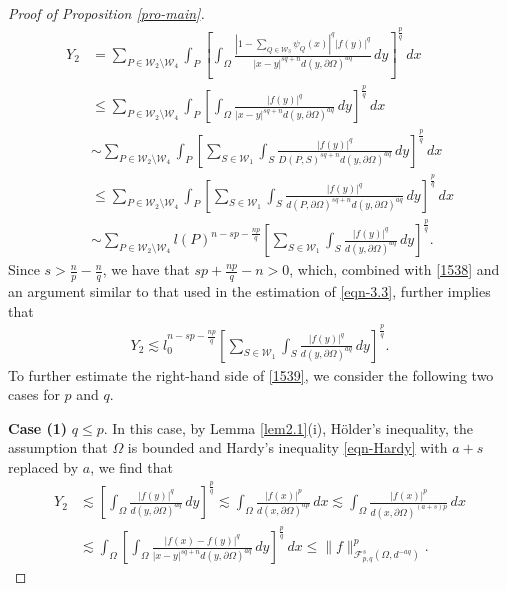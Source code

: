 \documentclass[11pt,twoside]{article}
\def\cf{{\mathcal F}}
\def\cw{\mathcal W}
\def\boz{{\Omega}}
\def\pa{\partial}                %
\newcounter{assum}
\theoremstyle{mylem}
\theoremstyle{definition}
\numberwithin{equation}{section}
\begin{document}
\begin{proof}[Proof of Proposition \ref{pro-main}]
\begin{align}
Y_2
&= \sum_{P\in\cw_2\setminus\cw_4} \int_{P}\left[ \int_{\boz} \frac{ |1- \sum_{Q\in\mathcal{W}_3} \psi_Q(x) |^q | f(y) |^q}{|x - y|^{s q + n}d(y,\pa\boz)^{aq}}\,dy \right]^{\frac{p}{q}}\,dx \nonumber \\
&\leq\sum_{P\in\cw_2\setminus\cw_4} \int_{P}\left[ \int_{\boz} \frac{ | f(y) |^q}{|x - y|^{s q + n}d(y,\pa\boz)^{aq}}\,dy \right]^{\frac{p}{q}} \,dx \nonumber\\
&\sim \sum_{P\in\cw_2\setminus\cw_4} \int_{P} \left[ \sum_{S\in\mathcal{W}_1} \int_{S} \frac{ | f(y) |^q}{D(P,S)^{s q + n}d(y,\pa\boz)^{aq}}\,dy \right]^{\frac{p}{q}}\,dx \nonumber\\
&\leq \sum_{P\in\cw_2\setminus\cw_4} \int_{P} \left[ \sum_{S\in\mathcal{W}_1} \int_{S} \frac{ | f(y) |^q}{d(P,\pa\boz)^{s q + n}d(y,\pa\boz)^{aq}}\,dy \right]^{\frac{p}{q}}\,dx \nonumber\\
&\sim\sum_{P\in\cw_2\setminus\cw_4}l(P)^{n-sp-\frac{np}{q}}\left[ \sum_{S\in\mathcal{W}_1} \int_{S} \frac{ | f(y) |^q}{d(y,\pa\boz)^{aq}} \,dy \right]^{\frac{p}{q}}.
\end{align}
Since $s>\frac{n}{p}-\frac{n}{q}$, we have that $s p + \frac{np}{q}-n>0$,
which, combined with \eqref{1538} and an argument similar to that used in the estimation of \eqref{eqn-3.3}, further implies that
\begin{align}\label{1539}
Y_2 \lesssim l_0^{n-sp - \frac{np}{q}}\left[ \sum_{S\in\mathcal{W}_1} \int_{S} \frac{ | f(y) |^q}{d(y,\pa\boz)^{aq}}\,dy \right]^{\frac{p}{q}}. 
\end{align}
To further estimate the right-hand side of \eqref{1539},
we consider the following two cases for $p$ and $q$.

{\bf Case (1)} $q\leq p$. In this case, by Lemma \ref{lem2.1}(i), H\"older's inequality, the assumption that $\boz$ is bounded and Hardy's inequality \eqref{eqn-Hardy} with $a+s$ replaced by $a$, we find that
\begin{align}
Y_2 &\lesssim\left[ \int_{\boz} \frac{ | f(y) |^q}{d(y,\pa\boz)^{aq}} \,dy \right]^{\frac{p}{q}}
\lesssim \int_{\boz}\frac{ | f(x) |^p}{d(x,\pa\boz)^{ap}}\,dx 
\lesssim \int_{\boz}\frac{ | f(x) |^p}{d(x,\pa\boz)^{(a+s)p}}\,dx\nonumber \\
&\lesssim \int_{\boz} \left[ \int_{\boz} \frac{|f(x) - f(y)|^q}{|x - y|^{s q + n}d(y,\pa\boz)^{aq}}\,dy \right]^{\frac{p}{q}}\,dx
\leq \| f \|_{\cf_{p,q}^{s}(\boz,d^{-aq})}^{p}.
\end{align}


\end{proof}
\end{document}
